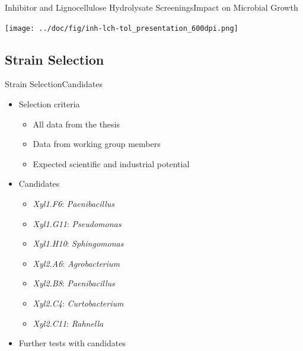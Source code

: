 \documentclass[mathserif]{beamer}
\newcommand{\mo}[1]{\emph{#1}} %
\newcommand{\xyli}[1]{\textit{Xyl1.#1}} %
\newcommand{\xylj}[1]{\textit{Xyl2.#1}} %
\newcommand{\LCH}{Lignocellulose Hydrolysate}
\begin{document}
\begin{frame}{Inhibitor and \LCH{} Screenings}{Impact on Microbial Growth}
	\begin{center}
		\texttt{[image: ../doc/fig/inh-lch-tol\_presentation\_600dpi.png]}
	\end{center}
\end{frame}

\subsection{Strain Selection}

\begin{frame}{Strain Selection}{Candidates}
	\begin{itemize}
		\item Selection criteria
			\begin{itemize}
				\item All data from the thesis
				\item Data from working group members
				\item Expected scientific and industrial potential
			\end{itemize}
		\pause
		\item Candidates
			\begin{itemize}
				\item \xyli{F6}: \mo{Paenibacillus}
				\item \xyli{G11}: \mo{Pseudomonas}
				\item \xyli{H10}: \mo{Sphingomonas}
				\item \xylj{A6}: \mo{Agrobacterium}
				\item \xylj{B8}: \mo{Paenibacillus}
				\item \xylj{C4}: \mo{Curtobacterium}
				\item \xylj{C11}: \mo{Rahnella}
			\end{itemize}
		\pause
		\item Further tests with candidates
	\end{itemize}
\end{frame}
\end{document}
